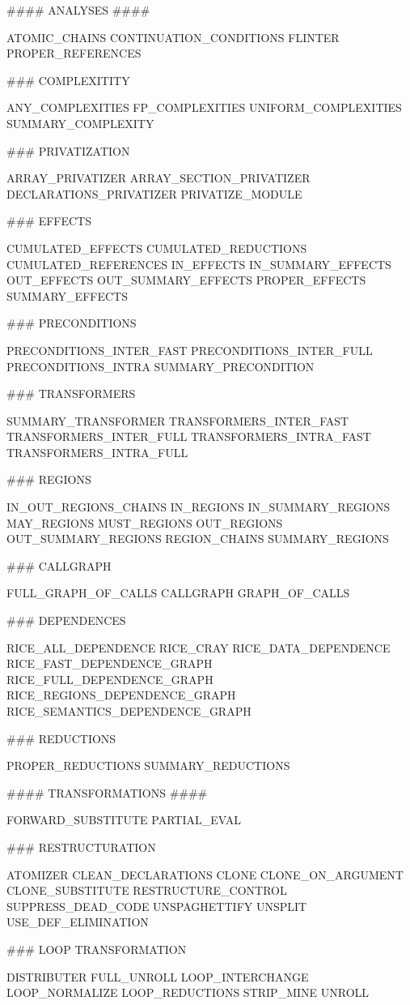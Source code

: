 \documentclass[a4paper,12pt]{article}
\begin{document}
{\bf \begin{verbatim*}
#### ANALYSES ####

ATOMIC_CHAINS                    
CONTINUATION_CONDITIONS  
FLINTER  
PROPER_REFERENCES

### COMPLEXITITY 

ANY_COMPLEXITIES  
FP_COMPLEXITIES  
UNIFORM_COMPLEXITIES
SUMMARY_COMPLEXITY

### PRIVATIZATION

ARRAY_PRIVATIZER  
ARRAY_SECTION_PRIVATIZER  
DECLARATIONS_PRIVATIZER 
PRIVATIZE_MODULE

### EFFECTS

CUMULATED_EFFECTS  
CUMULATED_REDUCTIONS  
CUMULATED_REFERENCES  
IN_EFFECTS 
IN_SUMMARY_EFFECTS 
OUT_EFFECTS  
OUT_SUMMARY_EFFECTS  
PROPER_EFFECTS
SUMMARY_EFFECTS


### PRECONDITIONS

PRECONDITIONS_INTER_FAST  
PRECONDITIONS_INTER_FULL  
PRECONDITIONS_INTRA  
SUMMARY_PRECONDITION


### TRANSFORMERS

SUMMARY_TRANSFORMER
TRANSFORMERS_INTER_FAST
TRANSFORMERS_INTER_FULL
TRANSFORMERS_INTRA_FAST
TRANSFORMERS_INTRA_FULL


### REGIONS 

IN_OUT_REGIONS_CHAINS  
IN_REGIONS 
IN_SUMMARY_REGIONS 
MAY_REGIONS 
MUST_REGIONS
OUT_REGIONS  
OUT_SUMMARY_REGIONS  
REGION_CHAINS
SUMMARY_REGIONS

### CALLGRAPH 

FULL_GRAPH_OF_CALLS  
CALLGRAPH  
GRAPH_OF_CALLS 

### DEPENDENCES

RICE_ALL_DEPENDENCE
RICE_CRAY
RICE_DATA_DEPENDENCE
RICE_FAST_DEPENDENCE_GRAPH
RICE_FULL_DEPENDENCE_GRAPH
RICE_REGIONS_DEPENDENCE_GRAPH
RICE_SEMANTICS_DEPENDENCE_GRAPH

### REDUCTIONS

PROPER_REDUCTIONS
SUMMARY_REDUCTIONS


#### TRANSFORMATIONS #### 

FORWARD_SUBSTITUTE            
PARTIAL_EVAL 

### RESTRUCTURATION 

ATOMIZER  
CLEAN_DECLARATIONS  
CLONE  
CLONE_ON_ARGUMENT  
CLONE_SUBSTITUTE  
RESTRUCTURE_CONTROL
SUPPRESS_DEAD_CODE
UNSPAGHETTIFY
UNSPLIT
USE_DEF_ELIMINATION

### LOOP TRANSFORMATION

DISTRIBUTER  
FULL_UNROLL 
LOOP_INTERCHANGE  
LOOP_NORMALIZE  
LOOP_REDUCTIONS  
STRIP_MINE
UNROLL


\end{verbatim*}}
\end{document}
